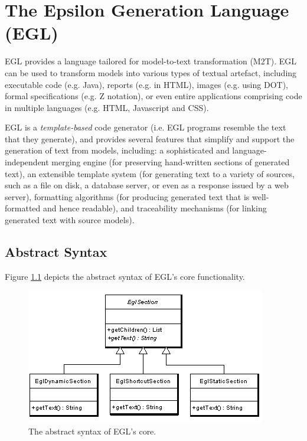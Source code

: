 
\chapter{The Epsilon Generation Language (EGL)}
\label{sec:EGL}
EGL provides a language tailored for model-to-text transformation (M2T). EGL can be used to transform models into various types of textual artefact, including executable code (e.g. Java), reports (e.g. in HTML), images (e.g. using DOT), formal specifications (e.g. Z notation), or even entire applications comprising code in multiple languages (e.g. HTML, Javascript and CSS).

EGL is a \emph{template-based} code generator (i.e. EGL programs resemble the text that they generate), and provides several features that simplify and support the generation of text from models, including: a sophisticated and language-independent merging engine (for preserving hand-written sections of generated text), an extensible template system (for generating text to a variety of sources, such as a file on disk, a database server, or even as a response issued by a web server), formatting algorithms (for producing generated text that is well-formatted and hence readable), and traceability mechanisms (for linking generated text with source models). 


\section{Abstract Syntax}
Figure \ref{fig:abstractsyntax} depicts the abstract syntax of EGL's core functionality.

\begin{figure}[htbp]
  \begin{center}
    \leavevmode
    \includegraphics[scale=0.80]{images/EglAbstractSyntax.png}
  \end{center}
  \caption{The abstract syntax of EGL's core.}
  \label{fig:abstractsyntax}
\end{figure}


